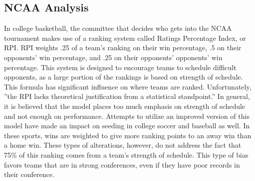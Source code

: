 \documentclass[sigconf]{acmart}
\begin{document}
\subsection{NCAA Analysis}
In college basketball, the committee that decides who gets into the NCAA tournament makes use of a ranking system called Ratings Percentage Index, or RPI. RPI weights .25 of a team's ranking on their win percentage, .5 on their opponents' win percentage, and .25 on their opponents' opponents' win percentage. \cite{RPI} This system is designed to encourage teams to schedule difficult opponents, as a large portion of the rankings is based on strength of schedule. This formula has significant influence on where teams are ranked. Unfortunately, ''the RPI lacks theoretical justification from a statistical standpoint.'' \cite{RPI} In general, it is believed that the model places too much emphasis on strength of schedule and not enough on performance. Attempts to utilize an improved version of this model have made an impact on seeding in college soccer and baseball as well. In these sports, wins are weighted to give more ranking points to an away win than a home win.\cite{RPI} These types of alterations, however, do not address the fact that 75\% of this ranking comes from a team's strength of schedule. This type of bias favors teams that are in strong conferences, even if they have poor records in their conference. \cite{paper2}
\end{document}
